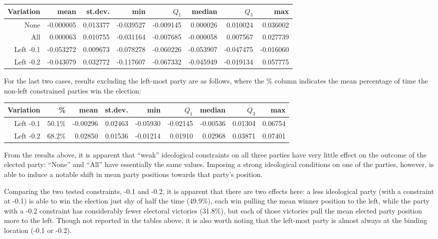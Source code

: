 \documentclass[12pt]{article}
\numberwithin{equation}{subsection}
\begin{document}
\begin{tabular}{r|r|r|r|r|r|r|r}
    Variation & mean & st.dev. & min & $Q_1$ & median & $Q_3$ & max \\
    \hline
None & -0.000005 & 0.013377 & -0.039527 & -0.009145 &  0.000026 & 0.010024 & 0.036002  \\
All & 0.000063 & 0.010755 & -0.031164 & -0.007685 & -0.000058 & 0.007567 & 0.027739  \\
Left -0.1 & -0.053272 & 0.009673 & -0.078278 & -0.060226 & -0.053907 & -0.047475 & -0.016060  \\
Left -0.2 & -0.043079 & 0.032772 & -0.117607 & -0.067332 & -0.045949 & -0.019134 &  0.057775  \\
\end{tabular}

For the last two cases, results excluding the left-most party are as follows, where the \% column
indicates the mean percentage of time the non-left constrained parties win the election:

\begin{tabular}{r|r|r|r|r|r|r|r|r}
    Variation & \% & mean    & st.dev. &      min & $Q_1$   & median  & $Q_3$   & max \\
    \hline
Left -0.1 & 50.1\% & -0.00296 & 0.02463 & -0.05930 & -0.02145 & -0.00536 & 0.01304 & 0.06754  \\
Left -0.2 & 68.2\% &  0.02850 & 0.01536 & -0.01214 &  0.01910 &  0.02968 & 0.03871 & 0.07401  \\
\end{tabular}


From the results above, it is apparent that ``weak'' ideological constraints on all three parties
have very little effect on the outcome of the elected party: ``None'' and ``All'' have essentially
the same values.  Imposing a strong ideological conditions on one of the parties, however, is able
to induce a notable shift in mean party positions towards that party's position.

Comparing the two tested constraints, -0.1 and -0.2, it is apparent that there are two effects here:
a less ideological party (with a constraint at -0.1) is able to win the election just shy of half
the time (49.9\%), each win pulling the mean winner position to the left, while the party with a -0.2
constraint has considerably fewer electoral victories (31.8\%), but each of those victories pull the
mean elected party position more to the left.  Though not reported in the tables above, it is also worth
noting that the left-most party is almost always at the binding location (-0.1 or -0.2).
\end{document}
